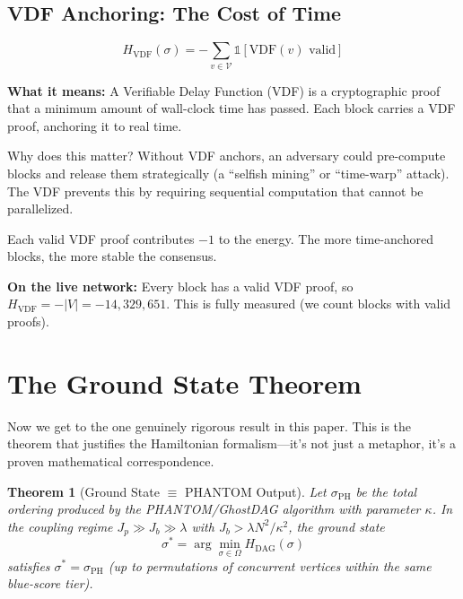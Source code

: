 \documentclass[11pt,a4paper]{article}
\newtheorem{theorem}{Theorem}[section]
\begin{document}
\subsection{VDF Anchoring: The Cost of Time}

\begin{blackboard}
\begin{equation}
H_{\text{VDF}}(\sigma) = -\sum_{v \in \mathcal{V}} \mathbb{1}[\mathrm{VDF}(v) \text{ valid}]
\end{equation}

\textbf{What it means:} A Verifiable Delay Function (VDF) is a cryptographic proof that a minimum amount of wall-clock time has passed. Each block carries a VDF proof, anchoring it to real time.

Why does this matter? Without VDF anchors, an adversary could pre-compute blocks and release them strategically (a ``selfish mining'' or ``time-warp'' attack). The VDF prevents this by requiring sequential computation that cannot be parallelized.

Each valid VDF proof contributes $-1$ to the energy. The more time-anchored blocks, the more stable the consensus.

\textbf{On the live network:} Every block has a valid VDF proof, so $H_{\text{VDF}} = -|V| = -14{,}329{,}651$. This is fully measured (we count blocks with valid proofs).
\end{blackboard}

\section{The Ground State Theorem}
\label{sec:groundstate}

Now we get to the one genuinely rigorous result in this paper. This is the theorem that justifies the Hamiltonian formalism---it's not just a metaphor, it's a proven mathematical correspondence.

\begin{theorem}[Ground State $\equiv$ PHANTOM Output]
\label{thm:ground_state}
Let $\sigma_{\text{PH}}$ be the total ordering produced by the PHANTOM/GhostDAG algorithm with parameter $\kappa$. In the coupling regime $J_p \gg J_b \gg \lambda$ with $J_b > \lambda N^2/\kappa^2$, the ground state
\[
\sigma^* = \arg\min_{\sigma \in \Omega} H_{\text{DAG}}(\sigma)
\]
satisfies $\sigma^* = \sigma_{\text{PH}}$ (up to permutations of concurrent vertices within the same blue-score tier).
\end{theorem}
\end{document}

